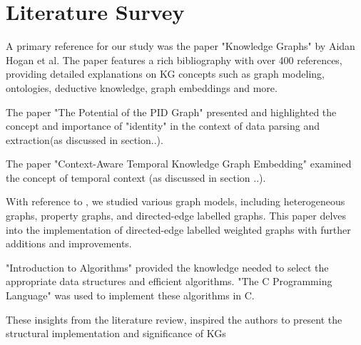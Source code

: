 \documentclass[conference]{IEEEtran}
\begin{document}
\section{Literature Survey}

A primary reference for our study was the paper "Knowledge Graphs"\cite{b8} by Aidan Hogan et al. The paper features a rich bibliography with over 400 references, providing detailed explanations on KG concepts such as graph modeling, ontologies, deductive knowledge, graph embeddings and more. 

The paper "The Potential of the PID Graph" \cite{b16} presented and highlighted the concept and importance of "identity" in the context of data parsing and extraction(as discussed in section..).

The paper "Context-Aware Temporal Knowledge Graph Embedding" \cite{b17} examined the concept of temporal context (as discussed in section ..).



With reference to \cite{b8}, we studied various graph models, including heterogeneous graphs\cite{b18}, property graphs\cite{b12}, and directed-edge labelled graphs\cite{b8}. This paper delves into the implementation of directed-edge labelled weighted graphs with further additions and improvements.

"Introduction to Algorithms" \cite{b14} provided the knowledge needed to select the appropriate data structures and efficient algorithms. "The C Programming Language" \cite{b9} was used to implement these algorithms in C.

These insights from the literature review, inspired the authors to present the structural implementation and significance of KGs
\end{document}
